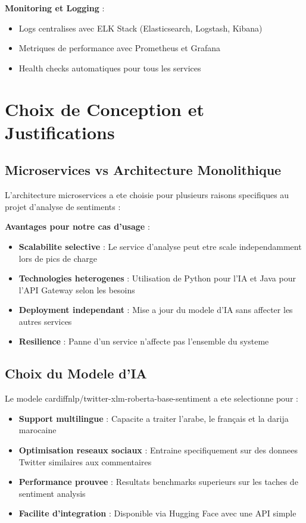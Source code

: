 \textbf{Monitoring et Logging} :
\begin{itemize}
    \item Logs centralises avec ELK Stack (Elasticsearch, Logstash, Kibana)
    \item Metriques de performance avec Prometheus et Grafana
    \item Health checks automatiques pour tous les services
\end{itemize}

\section{Choix de Conception et Justifications}

\subsection{Microservices vs Architecture Monolithique}

L'architecture microservices a ete choisie pour plusieurs raisons specifiques au projet d'analyse de sentiments :

\textbf{Avantages pour notre cas d'usage} :
\begin{itemize}
    \item \textbf{Scalabilite selective} : Le service d'analyse peut etre scale independamment lors de pics de charge
    \item \textbf{Technologies heterogenes} : Utilisation de Python pour l'IA et Java pour l'API Gateway selon les besoins
    \item \textbf{Deployment independant} : Mise a jour du modele d'IA sans affecter les autres services
    \item \textbf{Resilience} : Panne d'un service n'affecte pas l'ensemble du systeme
\end{itemize}

\subsection{Choix du Modele d'IA}

Le modele cardiffnlp/twitter-xlm-roberta-base-sentiment \cite{10} a ete selectionne pour :

\begin{itemize}
    \item \textbf{Support multilingue} : Capacite a traiter l'arabe, le français et la darija marocaine
    \item \textbf{Optimisation reseaux sociaux} : Entraine specifiquement sur des donnees Twitter similaires aux commentaires
    \item \textbf{Performance prouvee} : Resultats benchmarks superieurs sur les taches de sentiment analysis
    \item \textbf{Facilite d'integration} : Disponible via Hugging Face avec une API simple
\end{itemize}

